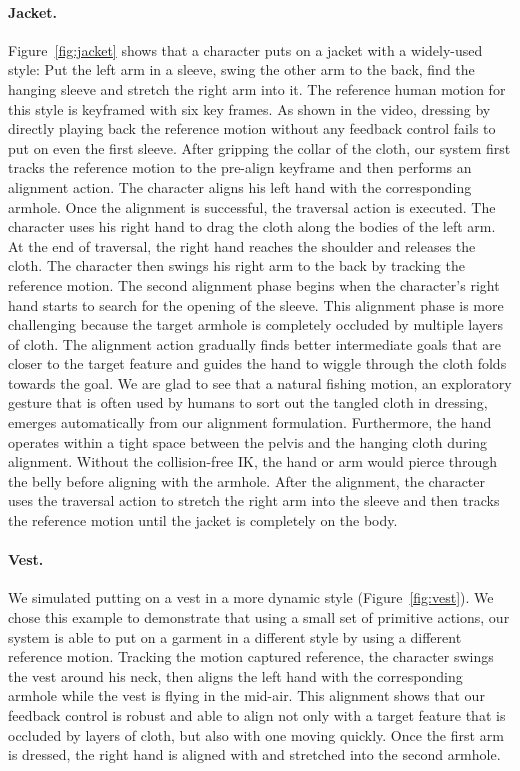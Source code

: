 \paragraph{Jacket.} Figure~\ref{fig:jacket} shows that a character puts on a jacket with a widely-used style: Put the left arm in a sleeve, swing the other arm to the back, find the hanging sleeve and stretch the right arm into it. The reference human motion for this style is keyframed with six key frames. As shown in the video, dressing by directly playing back the reference motion without any feedback control fails to put on even the first sleeve. After gripping the collar of the cloth, our system first tracks the reference motion to the pre-align keyframe and then performs an alignment action. The character aligns his left hand with the corresponding armhole. Once the alignment is successful, the traversal action is executed. The character uses his right hand to drag the cloth along the bodies of the left arm. At the end of traversal, the right hand reaches the shoulder and releases the cloth. The character then swings his right arm to the back by tracking the reference motion. The second alignment phase begins when the character's right hand starts to search for the opening of the sleeve. This alignment phase is more challenging because the target armhole is completely occluded by multiple layers of cloth. The alignment action gradually finds better intermediate goals that are closer to the target feature and guides the hand to wiggle through the cloth folds towards the goal. We are glad to see that a natural fishing motion, an exploratory gesture that is often used by humans to sort out the tangled cloth in dressing, emerges automatically from our alignment formulation. Furthermore, the hand operates within a tight space between the pelvis and the hanging cloth during alignment. Without the collision-free IK, the hand or arm would pierce through the belly before aligning with the armhole. After the alignment, the character uses the traversal action to stretch the right arm into the sleeve and then tracks the reference motion until the jacket is completely on the body.

\paragraph{Vest.} We simulated putting on a vest in a more dynamic style (Figure~\ref{fig:vest}). We chose this example to demonstrate that using a small set of primitive actions, our system is able to put on a garment in a different style by using a different reference motion. Tracking the motion captured reference, the character swings the vest around his neck, then aligns the left hand with the corresponding armhole while the vest is flying in the mid-air. This alignment shows that our feedback control is robust and able to align not only with a target feature that is occluded by layers of cloth, but also with one moving quickly. Once the first arm is dressed, the right hand is aligned with and stretched into the second armhole. 

